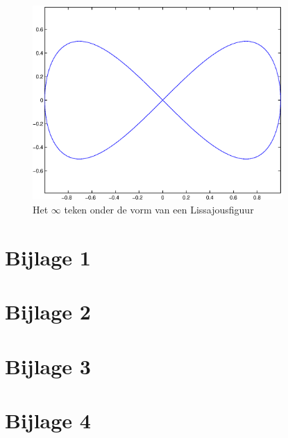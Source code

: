 \documentclass[a4paper]{article}
\begin{document}
\begin{figure}
        \centering
        \includegraphics[width=0.85\textwidth]{lissajous.eps}
        \caption{Het $\infty$ teken onder de vorm van een Lissajousfiguur}
        \label{fig:lissajous}
    \end{figure}
\newpage
\section*{Bijlage 1} 

\label{bijlage:1}
\section*{Bijlage 2} 

\label{bijlage:2}
\newpage
\section*{Bijlage 3} 

\label{bijlage:3}
\newpage
\section*{Bijlage 4} 

\label{bijlage:4}
\end{document}

